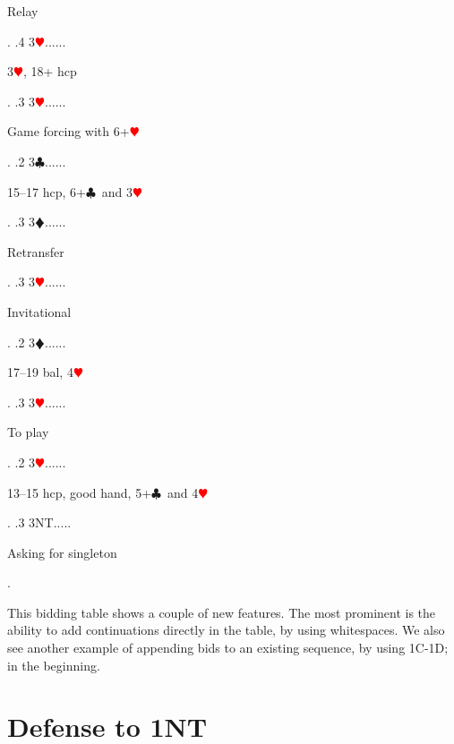 \documentclass[a4paper]{article}
\newcommand{\BC}{\textcolor{OliveGreen}{$\clubsuit$}}
\newcommand{\BD}{\textcolor{RedOrange}{$\vardiamondsuit$}}
\newcommand{\BH}{\textcolor{Red}{$\varheartsuit${}}}
\begin{document}
{\begin{minipage}[t]{0.8\textwidth}
Relay
\end{minipage}. 
 .4 3\BH......\begin{minipage}[t]{0.8\textwidth}
3\BH , 18+ hcp
\end{minipage}. 
 .3 3\BH......\begin{minipage}[t]{0.8\textwidth}
Game forcing with 6+\BH 
\end{minipage}. 
 .2 3\BC......\begin{minipage}[t]{0.8\textwidth}
15--17 hcp, 6+\BC\ and 3\BH 
\end{minipage}. 
 .3 3\BD......\begin{minipage}[t]{0.8\textwidth}
Retransfer
\end{minipage}. 
 .3 3\BH......\begin{minipage}[t]{0.8\textwidth}
Invitational
\end{minipage}. 
 .2 3\BD......\begin{minipage}[t]{0.8\textwidth}
17--19 bal, 4\BH 
\end{minipage}. 
 .3 3\BH......\begin{minipage}[t]{0.8\textwidth}
To play
\end{minipage}. 
 .2 3\BH......\begin{minipage}[t]{0.8\textwidth}
13--15 hcp, good hand, 5+\BC\ and 4\BH 
\end{minipage}. 
 .3 3NT.....\begin{minipage}[t]{0.8\textwidth}
Asking for singleton
\end{minipage}. 
}
\bigbreak
This bidding table shows a couple of new features. The most
prominent is the ability to add continuations directly in the
table, by using whitespaces. We also see another example of
appending bids to an existing sequence, by using 1C-1D; in the
beginning.
\bigbreak
\section{Defense to 1NT}
\end{document}
